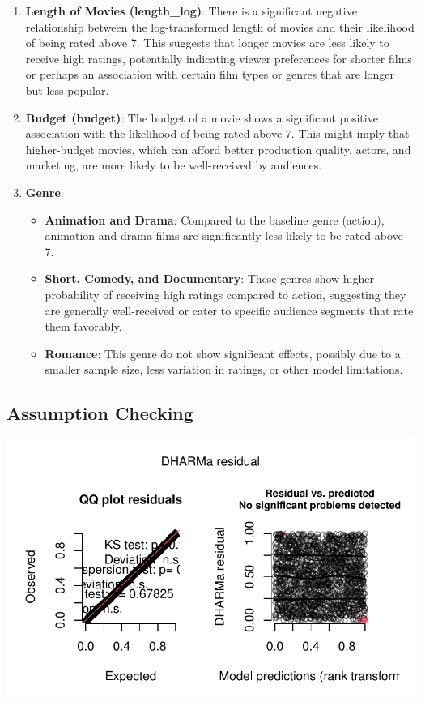 \documentclass[
  11pt,
]{article}
\providecommand{\tightlist}{%
  \setlength{\itemsep}{0pt}\setlength{\parskip}{0pt}}\usepackage{longtable,booktabs,array}
\begin{document}
\begin{enumerate}
\def\labelenumi{\arabic{enumi}.}
\item
  \textbf{Length of Movies (length\_log)}: There is a significant
  negative relationship between the log-transformed length of movies and
  their likelihood of being rated above 7. This suggests that longer
  movies are less likely to receive high ratings, potentially indicating
  viewer preferences for shorter films or perhaps an association with
  certain film types or genres that are longer but less popular.
\item
  \textbf{Budget (budget)}: The budget of a movie shows a significant
  positive association with the likelihood of being rated above 7. This
  might imply that higher-budget movies, which can afford better
  production quality, actors, and marketing, are more likely to be
  well-received by audiences.
\item
  \textbf{Genre}:

  \begin{itemize}
  \tightlist
  \item
    \textbf{Animation and Drama}: Compared to the baseline genre
    (action), animation and drama films are significantly less likely to
    be rated above 7.
  \item
    \textbf{Short, Comedy, and Documentary}: These genres show higher
    probability of receiving high ratings compared to action, suggesting
    they are generally well-received or cater to specific audience
    segments that rate them favorably.
  \item
    \textbf{Romance}: This genre do not show significant effects,
    possibly due to a smaller sample size, less variation in ratings, or
    other model limitations.
  \end{itemize}
\end{enumerate}

\hypertarget{assumption-checking}{%
\subsection{Assumption Checking}\label{assumption-checking}}

\includegraphics{Group_07_Analysis_files/figure-pdf/unnamed-chunk-33-1.pdf}
\end{document}
